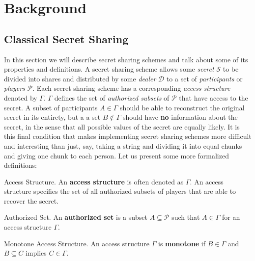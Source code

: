 \chapter{Background}
\label{ch:background}

\section{Classical Secret Sharing}
\label{sec:css}

In this section we will describe secret sharing schemes and talk about some of its properties and definitions. A secret sharing scheme allows some \textit{secret} $\mathcal{S}$ to be divided into shares and distributed by some \textit{dealer} $\mathcal{D}$ to a set of \textit{participants} or \textit{players} $\mathcal{P}$. Each secret sharing scheme has a corresponding \textit{access structure} denoted by $\Gamma$. $\Gamma$ defines the set of \textit{authorized subsets} of $\mathcal{P}$ that have access to the secret. A subset of participants $A \in \Gamma$ should be able to reconstruct the original secret in its entirety, but a a set $B \notin \Gamma$ should have \textbf{no} information about the secret, in the sense that all possible values of the secret are equally likely. It is this final condition that makes implementing secret sharing schemes more difficult and interesting than just, say, taking a string and dividing it into equal chunks and giving one chunk to each person. Let us present some more formalized definitions:

\theoremstyle{definition}
\begin{definition}{Access Structure.}
    \label{defn:access-structure}
    An \textbf{access structure} is often denoted as $\Gamma$. An access structure specifies the set of all authorized subsets of players that are able to recover the secret.
\end{definition}

\theoremstyle{definition}
\begin{definition}{Authorized Set.}
    \label{defn:authorized-set}
    An \textbf{authorized set} is a subset $A \subseteq \mathcal{P}$ such that $A \in \Gamma$ for an access structure $\Gamma$.
\end{definition}

\theoremstyle{definition}
\begin{definition}{Monotone Access Structure.}
    \label{defn:monotone}
    An access structure $\Gamma$ is \textbf{monotone} if $B \in \Gamma$ and $B \subseteq C$ implies $C \in \Gamma$.
\end{definition}

